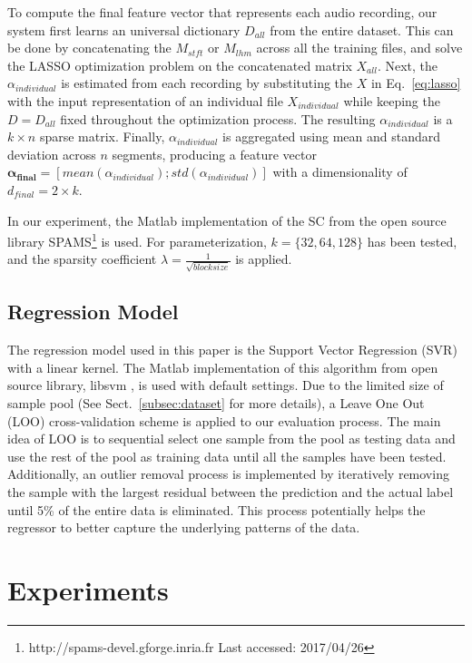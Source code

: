 \documentclass{article}
\begin{document}
To compute the final feature vector that represents each audio recording, our system first learns an universal dictionary $D_{all}$ from the entire dataset. This can be done by concatenating the $M_{stft}$ or $M_{lhm}$ across all the training files, and solve the LASSO optimization problem on the concatenated matrix $X_{all}$. Next, the $\alpha_{individual}$ is estimated from each recording by substituting the $X$ in Eq.~\ref{eq:lasso} with the input representation of an individual file $X_{individual}$ while keeping the $D = D_{all}$ fixed throughout the optimization process. The resulting $\alpha_{individual}$ is a $k \times n$ sparse matrix. Finally, $\alpha_{individual}$ is aggregated using mean and standard deviation across $n$ segments, producing a feature vector $\mathbf{\alpha_{final}} = [mean(\alpha_{individual}); std(\alpha_{individual})]$ with a dimensionality of $d_{final} = 2 \times k$.  

In our experiment, the Matlab implementation of the SC from the open source library SPAMS\footnote{http://spams-devel.gforge.inria.fr Last accessed: 2017/04/26}\cite{Mairal2009a} is used. For parameterization, $k = \{32, 64, 128\}$ has been tested, and the sparsity coefficient $\lambda = \frac{1}{\sqrt{block size}}$ is applied. 

\subsection{Regression Model}
The regression model used in this paper is the Support Vector Regression (SVR) with a linear kernel. The Matlab implementation of this algorithm from open source library, libsvm \cite{Chang2011}, is used with default settings. Due to the limited size of sample pool (See Sect.~\ref{subsec:dataset} for more details), a Leave One Out (LOO) cross-validation scheme is applied to our evaluation process. The main idea of LOO is to sequential select one sample from the pool as testing data and use the rest of the pool as training data until all the samples have been tested. Additionally, an outlier removal process is implemented by iteratively removing the sample with the largest residual between the prediction and the actual label until 5\% of the entire data is eliminated. This process potentially helps the regressor to better capture the underlying patterns of the data.  

\section{Experiments}\label{sec:experiments}
\end{document}
